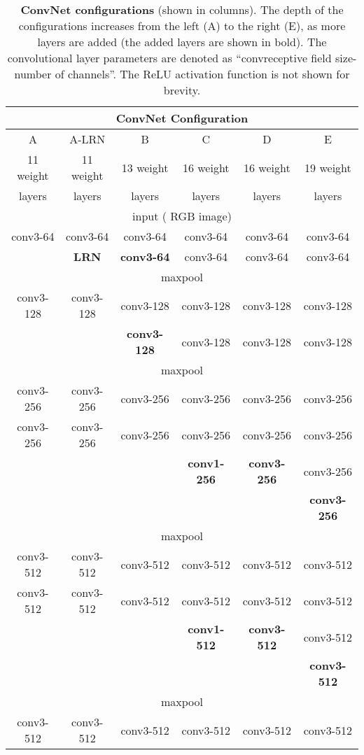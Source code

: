 \documentclass{article} \usepackage{iclr2015,times}
\begin{document}
\begin{table}[htb]
\centering
\small
\caption{\textbf{ConvNet configurations} (shown in columns).
The depth of the configurations increases from the left (A) to the right (E), as more layers are added (the added layers are shown in bold).
The convolutional layer parameters are denoted as ``convreceptive field size-number of channels''.
The ReLU activation function is not shown for brevity.
}
\begin{tabular}{|c|c|c|c|c|c|} \hline
\multicolumn{6}{|c|}{{ConvNet Configuration}} \\ \hline
A & A-LRN & B & C & D & E \\ \hline
11 weight & 11 weight & 13 weight & 16 weight & 16 weight & 19 weight \\ 
layers & layers & layers & layers & layers & layers \\ \hline\hline
\multicolumn{6}{|c|}{input ( RGB image)} \\ \hline
conv3-64 & conv3-64 & conv3-64 & conv3-64 & conv3-64 & conv3-64 \\ 
 & \textbf{LRN} & \textbf{conv3-64} & conv3-64 & conv3-64 & conv3-64\\ \hline
\multicolumn{6}{|c|}{maxpool} \\ \hline
conv3-128 & conv3-128 & conv3-128 & conv3-128 & conv3-128 & conv3-128 \\ 
 & & \textbf{conv3-128} & conv3-128 & conv3-128 & conv3-128 \\ \hline
\multicolumn{6}{|c|}{maxpool} \\ \hline
conv3-256 & conv3-256 & conv3-256 & conv3-256 & conv3-256 & conv3-256 \\ 
conv3-256 & conv3-256 & conv3-256 & conv3-256 & conv3-256 & conv3-256 \\ 
& & & \textbf{conv1-256} & \textbf{conv3-256} & conv3-256 \\ 
& & & & & \textbf{conv3-256} \\ \hline
\multicolumn{6}{|c|}{maxpool} \\ \hline
conv3-512 & conv3-512 & conv3-512 & conv3-512 & conv3-512 & conv3-512 \\ 
conv3-512 & conv3-512 & conv3-512 & conv3-512 & conv3-512 & conv3-512 \\ 
& & & \textbf{conv1-512} & \textbf{conv3-512} & conv3-512 \\ 
& & & & & \textbf{conv3-512} \\ \hline
\multicolumn{6}{|c|}{maxpool} \\ \hline
conv3-512 & conv3-512 & conv3-512 & conv3-512 & conv3-512 & conv3-512 \\ 

\end{tabular}
\end{table}
\end{document}

